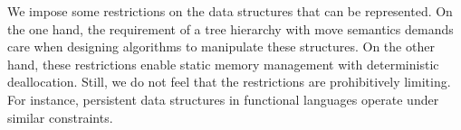 \documentclass{sig-alternate}
\newcommand{\CEU}{\textsc{C\'{e}u}\xspace}
\newcommand{\code}[1] {{\small{\texttt{#1}}}}
\begin{document}

We impose some restrictions on the data structures that can be represented.
On the one hand, the requirement of a tree hierarchy with move semantics 
demands care when designing algorithms to manipulate these structures.
On the other hand, these restrictions enable static memory management with
deterministic deallocation.
Still, we do not feel that the restrictions are prohibitively limiting.
For instance, persistent data structures in functional languages operate under 
similar constraints.

\balance



\balancecolumns
\end{document}

